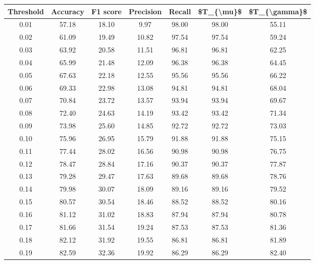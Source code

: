 \begin{tabular}{|c|c|c|c|c|c|c|}
\hline
 Threshold &  Accuracy &  F1 score &  Precision &  Recall &  \$T\_\{\textbackslash mu\}\$ &  \$T\_\{\textbackslash gamma\}\$ \\
\hline
      0.01 &     57.18 &     18.10 &       9.97 &   98.00 &      98.00 &         55.11 \\
      0.02 &     61.09 &     19.49 &      10.82 &   97.54 &      97.54 &         59.24 \\
      0.03 &     63.92 &     20.58 &      11.51 &   96.81 &      96.81 &         62.25 \\
      0.04 &     65.99 &     21.48 &      12.09 &   96.38 &      96.38 &         64.45 \\
      0.05 &     67.63 &     22.18 &      12.55 &   95.56 &      95.56 &         66.22 \\
      0.06 &     69.33 &     22.98 &      13.08 &   94.81 &      94.81 &         68.04 \\
      0.07 &     70.84 &     23.72 &      13.57 &   93.94 &      93.94 &         69.67 \\
      0.08 &     72.40 &     24.63 &      14.19 &   93.42 &      93.42 &         71.34 \\
      0.09 &     73.98 &     25.60 &      14.85 &   92.72 &      92.72 &         73.03 \\
      0.10 &     75.96 &     26.95 &      15.79 &   91.88 &      91.88 &         75.15 \\
      0.11 &     77.44 &     28.02 &      16.56 &   90.98 &      90.98 &         76.75 \\
      0.12 &     78.47 &     28.84 &      17.16 &   90.37 &      90.37 &         77.87 \\
      0.13 &     79.28 &     29.47 &      17.63 &   89.68 &      89.68 &         78.76 \\
      0.14 &     79.98 &     30.07 &      18.09 &   89.16 &      89.16 &         79.52 \\
      0.15 &     80.57 &     30.54 &      18.46 &   88.52 &      88.52 &         80.16 \\
      0.16 &     81.12 &     31.02 &      18.83 &   87.94 &      87.94 &         80.78 \\
      0.17 &     81.66 &     31.54 &      19.24 &   87.53 &      87.53 &         81.36 \\
      0.18 &     82.12 &     31.92 &      19.55 &   86.81 &      86.81 &         81.89 \\
      0.19 &     82.59 &     32.36 &      19.92 &   86.29 &      86.29 &         82.40 \\

\end{tabular}
